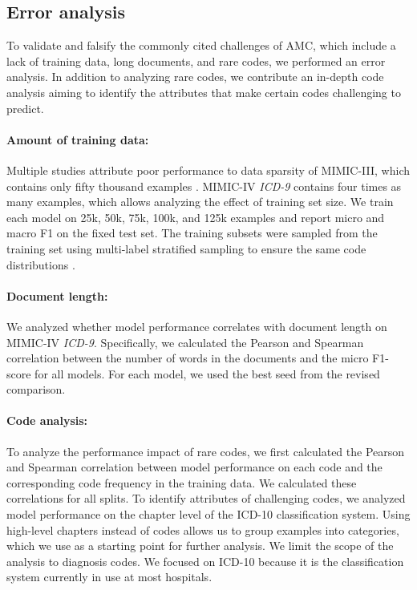 {\subsection{Error analysis}
To validate and falsify the commonly cited challenges of AMC, which include a lack of training data, long documents, and rare codes, we performed an error analysis. In addition to analyzing rare codes, we contribute an in-depth code analysis aiming to identify the attributes that make certain codes challenging to predict.


\paragraph{Amount of training data:}
Multiple studies attribute poor performance to data sparsity of MIMIC-III, which contains only fifty thousand examples \parencite{kavuluruEmpiricalEvaluationSupervised2015,tengExplainablePredictionMedical2020,yanMedicalCodingClassification2010,yangKnowledgeInjectedPrompt2022}. MIMIC-IV \textit{ICD-9} contains four times as many examples, which allows analyzing the effect of training set size. We train each model on 25k, 50k, 75k, 100k, and 125k examples and report micro and macro F1 on the fixed test set. The training subsets were sampled from the training set using multi-label stratified sampling to ensure the same code distributions \parencite{sechidisStratificationMultilabelData2011}.

\paragraph{Document length:}
We analyzed whether model performance correlates with document length on MIMIC-IV \textit{ICD-9}. Specifically, we calculated the Pearson and Spearman correlation between the number of words in the documents and the micro F1-score for all models. For each model, we used the best seed from the revised comparison.

\paragraph{Code analysis:}
To analyze the performance impact of rare codes, we first calculated the Pearson and Spearman correlation between model performance on each code and the corresponding code frequency in the training data. We calculated these correlations for all splits. To identify attributes of challenging codes, we analyzed model performance on the chapter level of the ICD-10 classification system. Using high-level chapters instead of codes allows us to group examples into categories, which we use as a starting point for further analysis. We limit the scope of the analysis to diagnosis codes. We focused on ICD-10 because it is the classification system currently in use at most hospitals. 


}
